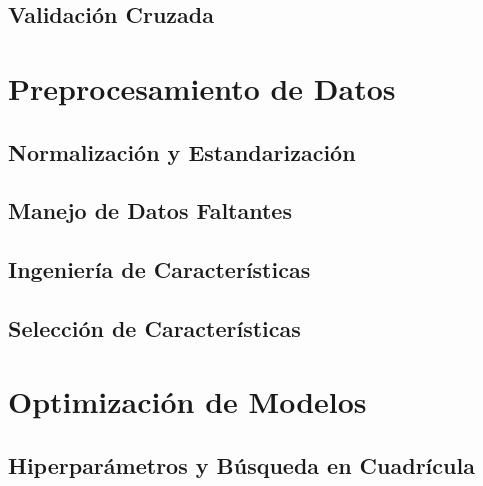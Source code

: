 \documentclass{book}
\begin{document}
\subsection{Validación Cruzada}
\newpage
\section{Preprocesamiento de Datos}

\subsection{Normalización y Estandarización}
\newpage
\subsection{Manejo de Datos Faltantes}
\newpage
\subsection{Ingeniería de Características}
\newpage
\subsection{Selección de Características}
\newpage
\section{Optimización de Modelos}

\subsection{Hiperparámetros y Búsqueda en Cuadrícula}
\newpage
\end{document}
